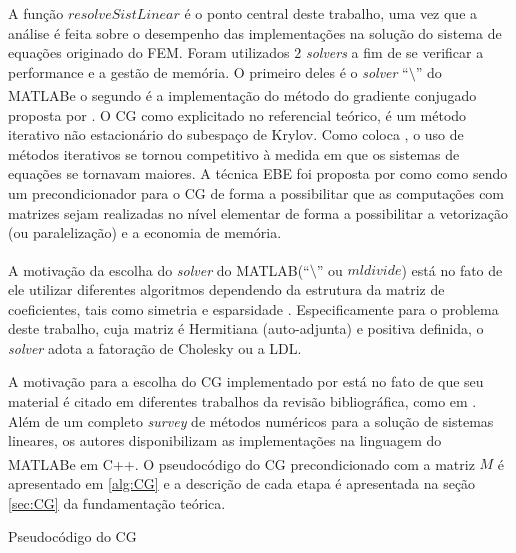 \documentclass[
    12pt,               %
    openright,          %
    oneside,
    a4paper,            %
    english,            %
    french,             %
    spanish,            %
    brazil              %
    ]{abntex2}
\newcommand{\matlab}{MATLAB\textsuperscript{\textregistered}}
\begin{document}
A função $resolveSistLinear$ é o ponto central deste trabalho, uma vez que a análise é feita sobre o desempenho das implementações na solução do sistema de equações originado do FEM. Foram utilizados $2$ \textit{solvers} a fim de se verificar a performance e a gestão de memória. O primeiro deles é o \textit{solver} ``$\setminus$'' do \matlab e o segundo é a implementação do método do gradiente conjugado proposta por . O CG como explicitado no referencial teórico, é um método iterativo não estacionário do subespaço de Krylov. Como coloca , o uso de métodos iterativos se tornou competitivo à medida em que os sistemas de equações se tornavam maiores. A técnica EBE foi proposta por  como como sendo um precondicionador para o CG de forma a possibilitar que as computações com matrizes sejam realizadas no nível elementar \cite{Kiss2012} de forma a possibilitar a vetorização (ou paralelização) e a economia de memória.

A motivação da escolha do \textit{solver} do \matlab (``$\setminus$'' ou $mldivide$) está no fato de ele utilizar diferentes algoritmos dependendo da estrutura da matriz de coeficientes, tais como simetria e esparsidade \cite{matMldivide}. Especificamente para o problema deste trabalho, cuja matriz é Hermitiana (auto-adjunta) e positiva definida, o \textit{solver} adota a fatoração de Cholesky ou a LDL.

A motivação para a escolha do CG implementado por  está no fato de que seu material é citado em diferentes trabalhos da revisão bibliográfica, como em . Além de um completo \textit{survey} de métodos numéricos para a solução de sistemas lineares, os autores disponibilizam as implementações na linguagem do \matlab e em C++. O pseudocódigo do CG precondicionado com a matriz $M$ é apresentado em \ref{alg:CG} e a descrição de cada etapa é apresentada na seção \ref{sec:CG} da fundamentação teórica.

\begin{algorithm}	
	\caption{\label{alg:CG}Pseudocódigo do CG} 
	\begin{algorithmic}[1]
				\Else
			\EndIf	
			\EndIf
		\EndFor
	\end{algorithmic}
\end{algorithm}
\end{document}
